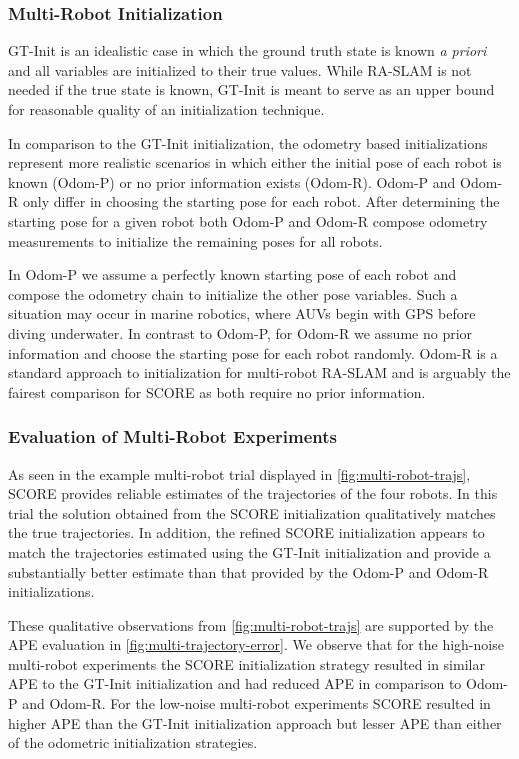 \subsubsection{Multi-Robot Initialization}
\label{sec:multi-robot-init}

GT-Init is an idealistic case in which the ground truth state is known \textit{a
priori} and all variables are initialized to their true values. While RA-SLAM is
not needed if the true state is known, GT-Init is meant to serve as an upper
bound for reasonable quality of an initialization technique.

In comparison to the GT-Init initialization, the odometry based initializations
represent more realistic scenarios in which either the initial pose of each
robot is known (Odom-P) or no prior information exists (Odom-R). Odom-P and
Odom-R only differ in choosing the starting pose for each robot. After
determining the starting pose for a given robot both Odom-P and Odom-R compose
odometry measurements to initialize the remaining poses for all robots.

In Odom-P we assume a perfectly known starting pose of each robot and compose
the odometry chain to initialize the other pose variables. Such a situation may
occur in marine robotics, where AUVs begin with GPS before diving underwater.
In contrast to Odom-P, for Odom-R we assume no prior information and choose the
starting pose for each robot randomly. Odom-R is a standard
approach to initialization for multi-robot RA-SLAM \cite{guo2017ijmav,li20arxiv}
and is arguably the fairest comparison for SCORE as both require no prior
information.


\subsubsection{Evaluation of Multi-Robot Experiments}

As seen in the example multi-robot trial displayed in
\cref{fig:multi-robot-trajs}, SCORE provides reliable estimates of the
trajectories of the four robots. In this trial the solution obtained from the
SCORE initialization qualitatively matches the true trajectories. In addition,
the refined SCORE initialization appears to match the trajectories estimated
using the GT-Init initialization and provide a substantially better estimate
than that provided by the Odom-P and Odom-R initializations.

These qualitative observations from \cref{fig:multi-robot-trajs} are supported
by the APE evaluation in \cref{fig:multi-trajectory-error}. We
observe that for the high-noise multi-robot experiments the SCORE initialization
strategy resulted in similar APE to the GT-Init initialization and had
reduced APE in comparison to Odom-P and Odom-R. For the low-noise multi-robot
experiments SCORE resulted in higher APE than the GT-Init initialization
approach but lesser APE than either of the odometric initialization strategies.
